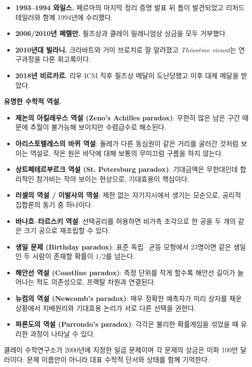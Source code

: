 \begin{itemize}
\item \textbf{1993--1994 와일스.} 페르마의 마지막 정리 증명 발표 뒤 틈이 발견되었고 리처드 테일러와 함께 1994년에 수리했다.
\item \textbf{2006/2010년 페렐만.} 필즈상과 클레이 밀레니엄상 상금을 모두 거부했다.
\item \textbf{2010년대 빌라니.} 크라바트와 거미 브로치로 잘 알려졌고 \textit{Théorème vivant}는 연구과정을 다룬 회고록이다.
\item \textbf{2018년 비르카르.} 리우 ICM 직후 필즈상 메달이 도난당했고 이후 대체 메달을 받았다.
\end{itemize}

\noindent\textbf{유명한 수학적 역설.}
\begin{itemize}
\item \textbf{제논의 아킬레우스 역설 (Zeno's Achilles paradox)}: 무한히 많은 남은 구간 때문에 추월이 불가능해 보이지만 수렴급수로 해소된다.
\item \textbf{아리스토텔레스의 바퀴 역설}: 둘레가 다른 동심원이 같은 거리를 굴러간 것처럼 보이는 역설로, 작은 원은 바닥에 대해 보통의 무미끄럼 구름을 하지 않는다.
\item \textbf{상트페테르부르크 역설 (St. Petersburg paradox)}: 기대금액은 무한대인데 합리적인 참가비는 작아 보이는 현상으로, 기대효용이 핵심이다.
\item \textbf{러셀의 역설 / 이발사의 역설}: 제한 없는 자기지시에서 생기는 모순으로, 공리적 집합론의 동기 중 하나이다.
\item \textbf{바나흐--타르스키 역설}: 선택공리를 허용하면 비가측 조각으로 한 공을 두 개의 같은 크기 공으로 재조립할 수 있다.
\item \textbf{생일 문제 (Birthday paradox)}: 표준 독립·균등 모형에서 23명이면 같은 생일인 두 사람이 존재할 확률이 $1/2$를 넘는다.
\item \textbf{해안선 역설 (Coastline paradox)}: 측정 단위를 작게 할수록 해안선 길이가 늘어나는 척도 의존성으로, 프랙탈 차원과 연결된다.
\item \textbf{뉴컴의 역설 (Newcomb's paradox)}: 매우 정확한 예측자가 미리 상자를 채운 상황에서 지배원리와 기대효용 논리가 서로 다른 선택을 권한다.
\item \textbf{파론도의 역설 (Parrondo's paradox)}: 각각은 불리한 확률게임을 섞었을 때 유리한 과정이 나타날 수 있다.
\end{itemize}


클레이 수학연구소가 2000년에 지정한 일곱 문제이며 각 문제의 상금은 미화 100만 달러이다. 문제 이름만이 아니라 대표 수학적 단서와 상태를 함께 기억한다.


